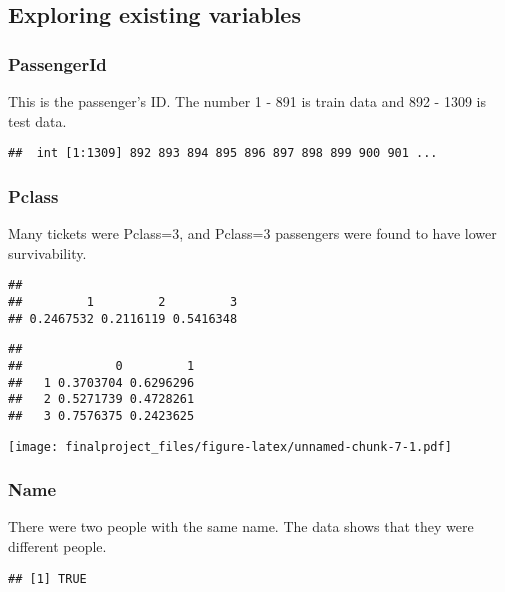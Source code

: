 \documentclass[
]{article}
\begin{document}
\hypertarget{exploring-existing-variables}{%
\subsection{\texorpdfstring{\textbf{Exploring existing
variables}}{Exploring existing variables}}\label{exploring-existing-variables}}

\hypertarget{passengerid}{%
\subsubsection{\texorpdfstring{\textbf{PassengerId}}{PassengerId}}\label{passengerid}}

This is the passenger's ID. The number 1 - 891 is train data and 892 -
1309 is test data.

\begin{verbatim}
##  int [1:1309] 892 893 894 895 896 897 898 899 900 901 ...
\end{verbatim}

\hypertarget{pclass}{%
\subsubsection{\texorpdfstring{\textbf{Pclass}}{Pclass}}\label{pclass}}

Many tickets were Pclass=3, and Pclass=3 passengers were found to have
lower survivability.

\begin{verbatim}
## 
##         1         2         3 
## 0.2467532 0.2116119 0.5416348
\end{verbatim}

\begin{verbatim}
##    
##             0         1
##   1 0.3703704 0.6296296
##   2 0.5271739 0.4728261
##   3 0.7576375 0.2423625
\end{verbatim}

\texttt{[image: finalproject\_files/figure-latex/unnamed-chunk-7-1.pdf]}

\hypertarget{name}{%
\subsubsection{\texorpdfstring{\textbf{Name}}{Name}}\label{name}}

There were two people with the same name. The data shows that they were
different people.

\begin{verbatim}
## [1] TRUE
\end{verbatim}
\end{document}
